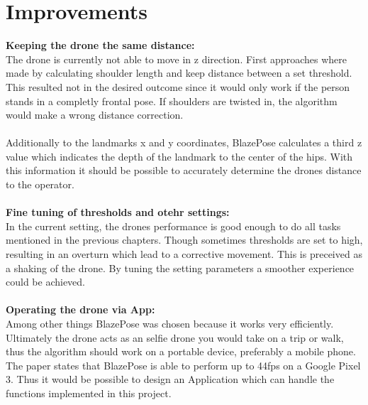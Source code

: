 \documentclass[a4paper,11pt,singlespacing]{article}
\begin{document}
\section{Improvements}
\textbf{Keeping the drone the same distance:}\\
The drone is currently not able to move in z direction. First approaches where made by calculating
shoulder length and keep distance between a set threshold. 
This resulted not in the desired outcome since it would only work if the person stands in a completly frontal pose.
If shoulders are twisted in, the algorithm would make a wrong distance correction.
\\\\
Additionally to the landmarks x and y coordinates, BlazePose calculates a third z value 
which indicates the depth of the landmark to the center of the hips. 
With this information it should be possible to accurately determine the drones distance to the operator.
\\\\
\textbf{Fine tuning of thresholds and otehr settings:}\\
In the current setting, the drones performance is good enough to do 
all tasks mentioned in the previous chapters. Though sometimes thresholds are set to high, 
resulting in an overturn which lead to a corrective movement. This is preceived as a shaking of the drone.
By tuning the setting parameters a smoother experience could be achieved.
\\\\
\textbf{Operating the drone via App:}\\
Among other things BlazePose was chosen because it works very efficiently.
Ultimately the drone acts as an selfie drone you would take on a trip or walk, 
thus the algorithm should work on a portable device, preferably a mobile phone.\\
The paper states\cite{BlazePosePaper} that BlazePose is able to perform up to 44fps on a Google Pixel 3.
Thus it would be possible to design an Application which can handle the functions implemented in this project. 

\pagebreak
\listoffigures
\pagebreak
\printbibliography[heading=bibintoc]
\pagebreak
\lstlistoflistings
\pagebreak




\end{document}
